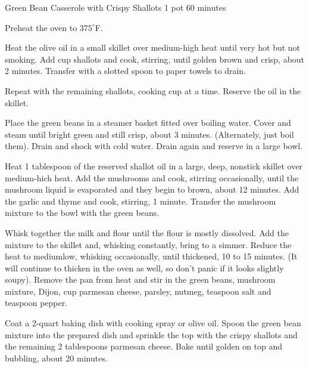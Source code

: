 \documentclass[a4paper]{article}
\begin{document}
\begin{recipe}{Green Bean Casserole with Crispy Shallots}
  {1 pot}
  {60 minutes}

Preheat the oven to $375^\circ$F.


Heat the olive oil in a small skillet over medium-high heat until very hot but
not smoking.
Add  cup shallots and cook, stirring, until golden brown and
crisp, about 2 minutes.
Transfer with a slotted spoon to paper towels to drain.

\medskip

Repeat with the remaining shallots, cooking  cup at a time.
Reserve the oil in the skillet.



Place the green beans in a steamer basket fitted over boiling water. Cover and
steam until bright green and still crisp, about 3 minutes. (Alternately, just
boil them).
Drain and shock with cold water.
Drain again and reserve in a large bowl.



Heat 1 tablespoon of the reserved shallot oil in a large, deep, nonstick skillet
over medium-hich heat.
Add the mushrooms and cook, stirring occasionally, until the mushroom liquid is
evaporated and they begin to brown, about 12 minutes.
Add the garlic and thyme and cook, stirring, 1 minute.
Transfer the mushroom mixture to the bowl with the green beans.



Whisk together the milk and flour until the flour is mostly dissolved.
Add the mixture to the skillet and, whisking constantly, bring to a simmer.
Reduce the heat to mediumlow, whisking occasionally, until thickened, 10 to 15
minutes. (It will continue to thicken in the oven as well, so don't panic if it
looks slightly soupy).
Remove the pan from heat and stir in the green beans, mushroom mixture, Dijon,
 cup parmesan cheese, parsley, nutmeg,  teaspoon
salt and  teaspoon pepper.

\bigskip

Coat a 2-quart baking dish with cooking spray or olive oil.
Spoon the green bean mixture into the prepared dish and sprinkle the top with
the crispy shallots and the remaining 2 tablespoons parmesan cheese.
Bake until golden on top and bubbling, about 20 minutes.

\end{recipe}
\end{document}
